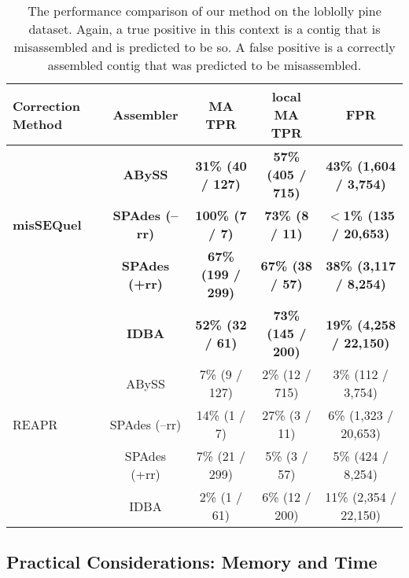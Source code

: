 \begin{table}[h!]
\begin{center}
\caption{The performance comparison of our method on the loblolly pine dataset. 
Again, a true positive in this context is a contig that is misassembled and is predicted to be so. 
A false positive is a correctly assembled contig that was predicted to be misassembled.}
{\setlength{\tabcolsep}{1em}
\begin{tabular}{|l|c|c|c|c|}
\hline
\textbf{Correction Method}& \textbf{Assembler} 		&{\bf MA TPR}				& {\bf local MA TPR}					& \textbf{FPR}	 \\ \hline
 					& {\bf ABySS}				&  {\bf 31\% (40 / 127)}		&  {\bf 57\% (405 / 715)} 		  	 	& {\bf 43\% (1,604 / 3,754)}		 	 \\ 
{\sc\bf misSEQuel}		& {\bf SPAdes (--rr)}			&  {\bf 100\% (7 / 7)}			&  {\bf 73\% (8 / 11)}			 		& {\bf $<$1\% (135 / 20,653)	}	 	 \\ 
					& {\bf SPAdes (+rr)}			&  {\bf 67\% (199 / 299)}		& {\bf 67\% (38 / 57)}			 		& {\bf 38\% (3,117 / 8,254)} 		 	 \\ 
					& {\bf IDBA}				&  {\bf 52\% (32 / 61)}		&  {\bf 73\% (145 / 200)} 		  	 	& {\bf 19\% (4,258 / 22,150)}			 \\ 
\hline 
					& ABySS					& 7\% (9 / 127) 				& 2\% (12 / 715) 		  			& 3\% (112 / 3,754)		 \\  
 REAPR				& SPAdes (--rr)				& 14\% (1 / 7)				& 27\% (3 / 11)		 				& 6\% (1,323 / 20,653)		 	 \\ 
					& SPAdes (+rr)				& 7\% (21 / 299)			& 5\% (3 / 57)		 				& 5\% (424 / 8,254)	 \\ 
					& IDBA					& 2\% (1 / 61)				& 6\% (12 / 200)		  	 		&11\% (2,354 / 22,150)		 \\  
\hline
\end{tabular}}
\label{tab:roc_pine}
\end{center}
\end{table}


\subsection{Practical Considerations: Memory and Time} \label{mem_time}


